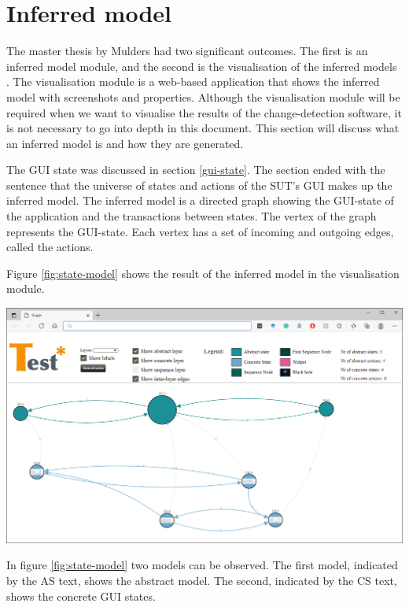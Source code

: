 \section{Inferred model} \label{inferred-model}
The master thesis by Mulders had two significant outcomes. The first is an inferred model module, and the second is the visualisation of the inferred models \cite{thesisMulders}. The visualisation module is a web-based application that shows the inferred model with screenshots and properties. Although the visualisation module will be required when we want to visualise the results of the change-detection software, it is not necessary to go into depth in this document. This section will discuss what an inferred model is and how they are generated. 

The GUI state was discussed in section \ref{gui-state}. The section ended with the sentence that the universe of states and actions of the SUT's GUI makes up the inferred model. The inferred model is a directed graph showing the GUI-state of the application and the transactions between states. The vertex of the graph represents the GUI-state. Each vertex has a set of incoming and outgoing edges, called the actions. 

Figure \ref{fig:state-model} shows the result of the inferred model in the visualisation module.

\bigskip
\begingroup
\captionsetup{type=figure}
\includegraphics[scale=0.38]{images/state-model.png}
\label{fig:state-model}
\endgroup

In figure \ref{fig:state-model} two models can be observed. The first model, indicated by the AS text, shows the abstract model. The second, indicated by the CS text, shows the concrete GUI states. 

